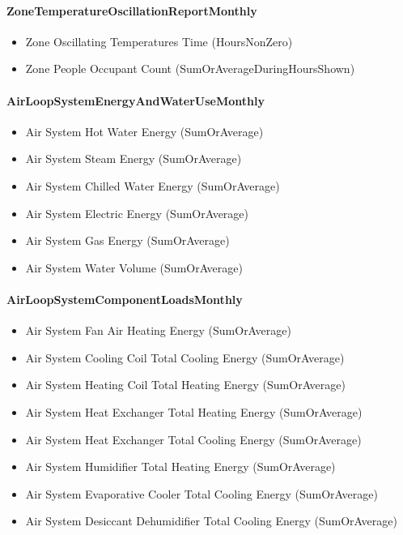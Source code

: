 \paragraph{ZoneTemperatureOscillationReportMonthly}\label{zonetemperatureoscillationreportmonthly}

\begin{itemize}
\item
  Zone Oscillating Temperatures Time (HoursNonZero)
\item
  Zone People Occupant Count (SumOrAverageDuringHoursShown)
\end{itemize}

\paragraph{AirLoopSystemEnergyAndWaterUseMonthly}\label{airloopsystemenergyandwaterusemonthly}

\begin{itemize}
\item
  Air System Hot Water Energy (SumOrAverage)
\item
  Air System Steam Energy (SumOrAverage)
\item
  Air System Chilled Water Energy (SumOrAverage)
\item
  Air System Electric Energy (SumOrAverage)
\item
  Air System Gas Energy (SumOrAverage)
\item
  Air System Water Volume (SumOrAverage)
\end{itemize}

\paragraph{AirLoopSystemComponentLoadsMonthly}\label{airloopsystemcomponentloadsmonthly}

\begin{itemize}
\item
  Air System Fan Air Heating Energy (SumOrAverage)
\item
  Air System Cooling Coil Total Cooling Energy (SumOrAverage)
\item
  Air System Heating Coil Total Heating Energy (SumOrAverage)
\item
  Air System Heat Exchanger Total Heating Energy (SumOrAverage)
\item
  Air System Heat Exchanger Total Cooling Energy (SumOrAverage)
\item
  Air System Humidifier Total Heating Energy (SumOrAverage)
\item
  Air System Evaporative Cooler Total Cooling Energy (SumOrAverage)
\item
  Air System Desiccant Dehumidifier Total Cooling Energy (SumOrAverage)
\end{itemize}

